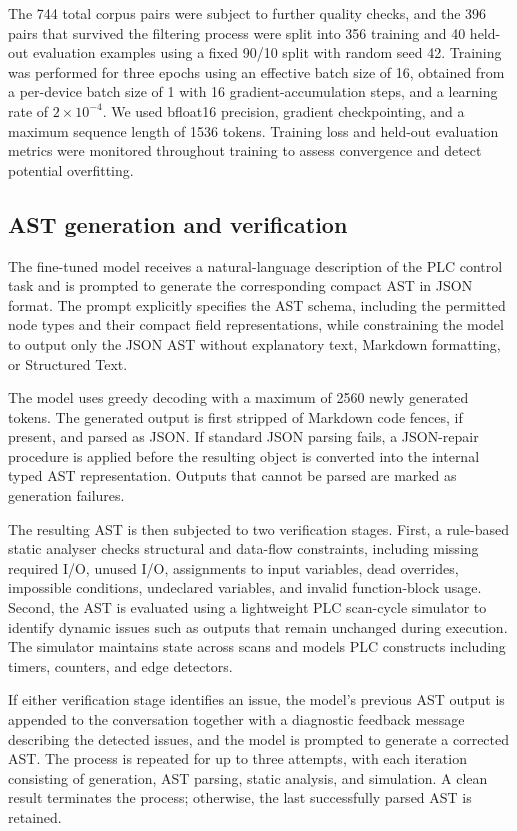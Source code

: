 \documentclass{ceurart}
\begin{document}
The 744 total corpus pairs were subject to further quality checks, and the 396 pairs that survived the filtering process were split into 356 training and 40 held-out evaluation examples using a fixed 90/10 split with random seed 42. Training was performed for three epochs using an effective batch size of 16, obtained from a per-device batch size of 1 with 16 gradient-accumulation steps, and a learning rate of $2\times10^{-4}$. We used bfloat16 precision, gradient checkpointing, and a maximum sequence length of 1536 tokens. Training loss and held-out evaluation metrics were monitored throughout training to assess convergence and detect potential overfitting.

\subsection{AST generation and verification}
The fine-tuned model receives a natural-language description of the PLC control task and is prompted to generate the corresponding compact AST in JSON format. The prompt explicitly specifies the AST schema, including the permitted node types and their compact field representations, while constraining the model to output only the JSON AST without explanatory text, Markdown formatting, or Structured Text.

The model uses greedy decoding with a maximum of 2560 newly generated tokens. The generated output is first stripped of Markdown code fences, if present, and parsed as JSON. If standard JSON parsing fails, a JSON-repair procedure is applied before the resulting object is converted into the internal typed AST representation. Outputs that cannot be parsed are marked as generation failures.

The resulting AST is then subjected to two verification stages. First, a rule-based static analyser checks structural and data-flow constraints, including missing required I/O, unused I/O, assignments to input variables, dead overrides, impossible conditions, undeclared variables, and invalid function-block usage. Second, the AST is evaluated using a lightweight PLC scan-cycle simulator to identify dynamic issues such as outputs that remain unchanged during execution. The simulator maintains state across scans and models PLC constructs including timers, counters, and edge detectors.

If either verification stage identifies an issue, the model's previous AST output is appended to the conversation together with a diagnostic feedback message describing the detected issues, and the model is prompted to generate a corrected AST. The process is repeated for up to three attempts, with each iteration consisting of generation, AST parsing, static analysis, and simulation. A clean result terminates the process; otherwise, the last successfully parsed AST is retained.
\end{document}
